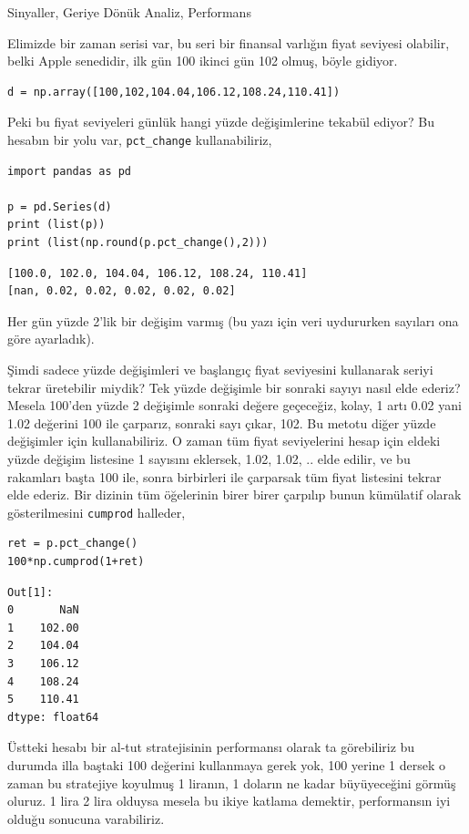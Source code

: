 \documentclass[12pt,fleqn]{article}\usepackage{../../common}
\begin{document}
Sinyaller, Geriye Dönük Analiz, Performans

Elimizde bir zaman serisi var, bu seri bir finansal varlığın fiyat seviyesi
olabilir, belki Apple senedidir, ilk gün 100 ikinci gün 102 olmuş, böyle
gidiyor.

\begin{verbatim}
d = np.array([100,102,104.04,106.12,108.24,110.41])
\end{verbatim}

Peki bu fiyat seviyeleri günlük hangi yüzde değişimlerine tekabül ediyor?
Bu hesabın bir yolu var, \verb!pct_change! kullanabiliriz,

\begin{verbatim}
import pandas as pd

p = pd.Series(d)
print (list(p))
print (list(np.round(p.pct_change(),2)))
\end{verbatim}

\begin{verbatim}
[100.0, 102.0, 104.04, 106.12, 108.24, 110.41]
[nan, 0.02, 0.02, 0.02, 0.02, 0.02]
\end{verbatim}

Her gün yüzde 2'lik bir değişim varmış (bu yazı için veri uydururken sayıları
ona göre ayarladık).

Şimdi sadece yüzde değişimleri ve başlangıç fiyat seviyesini kullanarak seriyi
tekrar üretebilir miydik? Tek yüzde değişimle bir sonraki sayıyı nasıl elde
ederiz?  Mesela 100'den yüzde 2 değişimle sonraki değere geçeceğiz, kolay, 1
artı 0.02 yani 1.02 değerini 100 ile çarparız, sonraki sayı çıkar, 102. Bu
metotu diğer yüzde değişimler için kullanabiliriz. O zaman tüm fiyat
seviyelerini hesap için eldeki yüzde değişim listesine 1 sayısını eklersek,
1.02, 1.02, .. elde edilir, ve bu rakamları başta 100 ile, sonra birbirleri ile
çarparsak tüm fiyat listesini tekrar elde ederiz. Bir dizinin tüm öğelerinin
birer birer çarpılıp bunun kümülatif olarak gösterilmesini \verb!cumprod!
halleder,

\begin{verbatim}
ret = p.pct_change()
100*np.cumprod(1+ret)
\end{verbatim}

\begin{verbatim}
Out[1]: 
0       NaN
1    102.00
2    104.04
3    106.12
4    108.24
5    110.41
dtype: float64
\end{verbatim}

Üstteki hesabı bir al-tut stratejisinin performansı olarak ta görebiliriz bu
durumda illa baştaki 100 değerini kullanmaya gerek yok, 100 yerine 1 dersek o
zaman bu stratejiye koyulmuş 1 liranın, 1 doların ne kadar büyüyeceğini görmüş
oluruz.  1 lira 2 lira olduysa mesela bu ikiye katlama demektir, performansın
iyi olduğu sonucuna varabiliriz.
\end{document}
